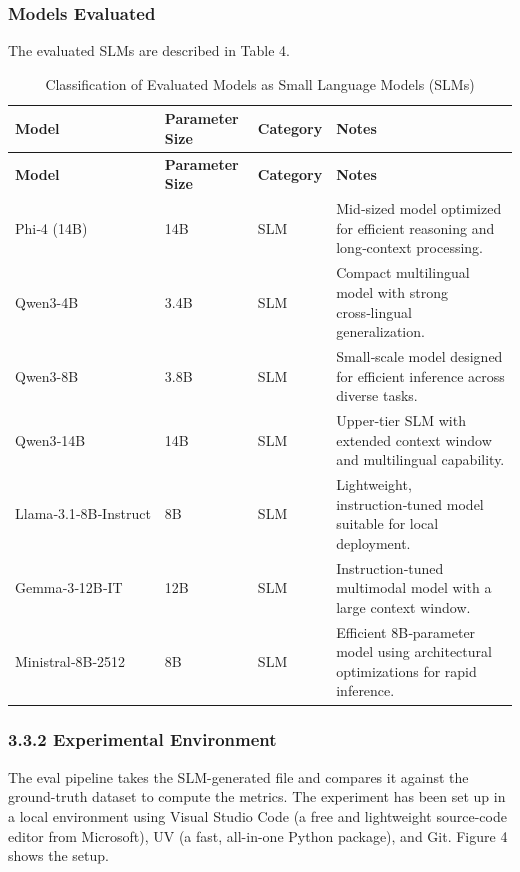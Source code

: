 \documentclass[]{article}
\begin{document}
\subsubsection{Models Evaluated}
The evaluated SLMs are described in Table 4.
\setcounter{table}{3}
\begin{longtable}{p{} p{} p{} p{}}
\caption{Classification of Evaluated Models as Small Language Models (SLMs)} \\
\toprule
\textbf{Model} & \textbf{Parameter Size} & \textbf{Category} & \textbf{Notes} \\
\midrule
\endfirsthead

\toprule
\textbf{Model} & \textbf{Parameter Size} & \textbf{Category} & \textbf{Notes} \\
\midrule
\endhead

\bottomrule
\endlastfoot

Phi‑4 (14B) & 14B & SLM & Mid‑sized model optimized for efficient reasoning and long‑context processing. \\
Qwen3-4B & 3.4B & SLM & Compact multilingual model with strong cross‑lingual generalization. \\
Qwen3-8B & 3.8B & SLM & Small‑scale model designed for efficient inference across diverse tasks. \\
Qwen3‑14B & 14B & SLM & Upper‑tier SLM with extended context window and multilingual capability. \\
Llama‑3.1‑8B‑Instruct & 8B & SLM & Lightweight, instruction‑tuned model suitable for local deployment. \\
Gemma‑3‑12B‑IT & 12B & SLM & Instruction‑tuned multimodal model with a large context window. \\
Ministral‑8B‑2512 & 8B & SLM & Efficient 8B‑parameter model using architectural optimizations for rapid inference. \\
\end{longtable}
\subsubsection{3.3.2 Experimental
Environment}\label{experimental-environment}

The eval pipeline takes the SLM-generated file and compares it against
the ground-truth dataset to compute the metrics. The experiment has been
set up in a local environment using Visual Studio Code (a free and
lightweight source-code editor from Microsoft), UV (a fast, all-in-one
Python package), and Git. Figure 4 shows the setup.
\end{document}
